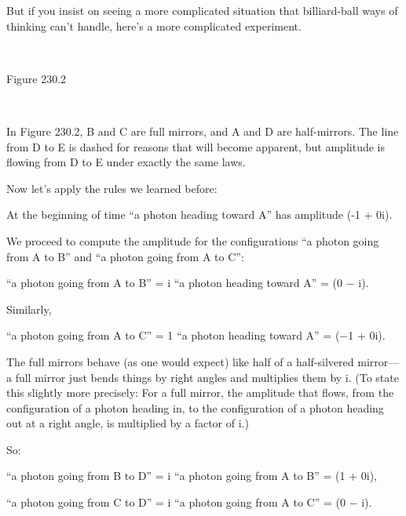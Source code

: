 {
 But if you insist on seeing a more complicated situation that
billiard-ball ways of thinking can't handle,
here's a more complicated experiment.}

{
 ~}

{\centering
{}
 \newline
 Figure 230.2
\par}


\bigskip

{
 ~}

{
 In Figure 230.2, B and C are full mirrors, and A and D are
half-mirrors. The line from D to E is dashed for reasons that will
become apparent, but amplitude is flowing from D to E under exactly the
same laws.}

{
 Now let's apply the rules we learned before:}

{
 At the beginning of time ``a photon heading
toward A'' has amplitude (-1 + 0i).}

{
 We proceed to compute the amplitude for the configurations
``a photon going from A to B'' and
``a photon going from A to C'':}

{\centering
 ``a photon going from A to B''
= i {\texttimes} ``a photon heading toward
A'' = (0 $-$ i).
\par}


\bigskip

{
 Similarly,}

{\centering
 ``a photon going from A to C''
= 1 {\texttimes} ``a photon heading toward
A'' = ($-$1 + 0i).
\par}


\bigskip

{
 The full mirrors behave (as one would expect) like half of a
half-silvered mirror---a full mirror just bends things by right angles
and multiplies them by i. (To state this slightly more precisely: For a
full mirror, the amplitude that flows, from the configuration of a
photon heading in, to the configuration of a photon heading out at a
right angle, is multiplied by a factor of i.)}

{
 So:}

{\centering
 ``a photon going from B to D''
= i {\texttimes} ``a photon going from A to
B'' = (1 + 0i),
\par}


\bigskip

{\centering
 ``a photon going from C to D''
= i {\texttimes} ``a photon going from A to
C'' = (0 $-$ i).
\par}


